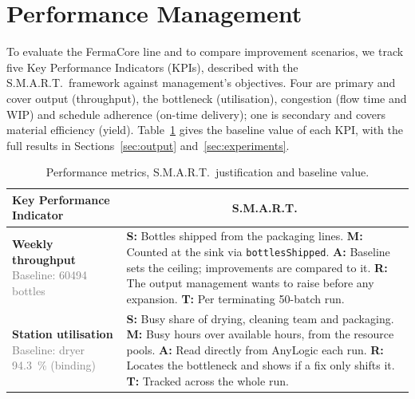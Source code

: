 \section{Performance Management}
\label{sec:performance}

To evaluate the FermaCore line and to compare improvement scenarios, we track
five Key Performance Indicators (KPIs), described with the S.M.A.R.T.\ framework
against management's objectives. Four are primary and cover output (throughput),
the bottleneck (utilisation), congestion (flow time and WIP) and schedule
adherence (on-time delivery); one is secondary and covers material efficiency
(yield). Table~\ref{tab:kpis} gives the baseline value of each KPI, with the full
results in Sections~\ref{sec:output} and~\ref{sec:experiments}.

\begin{table}[H]
\centering
\caption{Performance metrics, S.M.A.R.T.\ justification and baseline value.}
\label{tab:kpis}
\renewcommand{\arraystretch}{1.2}%
\small
\begin{tabularx}{\textwidth}{@{} >{\raggedright\arraybackslash}p{3.5cm} X @{}}
\toprule
\rowcolor{black!5}
\textbf{Key Performance Indicator} & \multicolumn{1}{c}{\textbf{S.M.A.R.T.}} \\
\midrule

\textbf{Weekly throughput}\newline
\textcolor{gray}{\footnotesize Baseline: \num{60494} bottles} &
\textcolor{red!70!black}{\textbf{S:}} Bottles shipped from the packaging lines. \newline
\textcolor{orange!80!black}{\textbf{M:}} Counted at the sink via \texttt{bottlesShipped}. \newline
\textcolor{green!60!black}{\textbf{A:}} Baseline sets the ceiling; improvements are compared to it. \newline
\textcolor{blue!70!black}{\textbf{R:}} The output management wants to raise before any expansion. \newline
\textcolor{purple!70!black}{\textbf{T:}} Per terminating 50-batch run. \\
\midrule

\textbf{Station utilisation}\newline
\textcolor{gray}{\footnotesize Baseline: dryer \SI{94.3}{\percent} (binding)} &
\textcolor{red!70!black}{\textbf{S:}} Busy share of drying, cleaning team and packaging. \newline
\textcolor{orange!80!black}{\textbf{M:}} Busy hours over available hours, from the resource pools. \newline
\textcolor{green!60!black}{\textbf{A:}} Read directly from AnyLogic each run. \newline
\textcolor{blue!70!black}{\textbf{R:}} Locates the bottleneck and shows if a fix only shifts it. \newline
\textcolor{purple!70!black}{\textbf{T:}} Tracked across the whole run. \\
\midrule


\end{tabularx}
\end{table}
